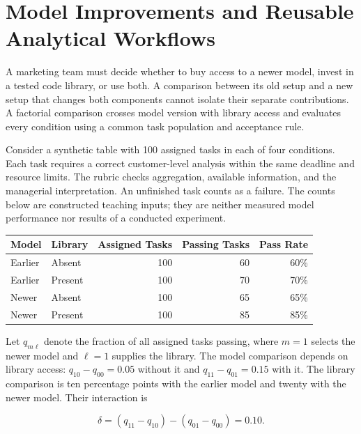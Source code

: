 \hypertarget{M06-model-improvements-and-reusable-analytical-workflows}{%
\section{Model Improvements and Reusable Analytical
Workflows}\label{M06-model-improvements-and-reusable-analytical-workflows}}

\noindent \noindent A marketing team must decide whether to buy access to a newer
model, invest in a tested code library, or use both. A comparison
between its old setup and a new setup that changes both components
cannot isolate their separate contributions. A factorial comparison
crosses model version with library access and evaluates every condition
using a common task population and acceptance rule.

Consider a synthetic table with 100 assigned tasks in each of four
conditions. Each task requires a correct customer-level analysis within
the same deadline and resource limits. The rubric checks aggregation,
available information, and the managerial interpretation. An unfinished
task counts as a failure. The counts below are constructed teaching
inputs; they are neither measured model performance nor results of a
conducted experiment.

\begin{table}[H]
\centering\small
\begin{tabular}{@{}llrrr@{}}
\toprule
Model & Library & Assigned Tasks & Passing Tasks & Pass Rate \\
\midrule

Earlier & Absent & 100 & 60 & 60\% \\
Earlier & Present & 100 & 70 & 70\% \\
Newer & Absent & 100 & 65 & 65\% \\
Newer & Present & 100 & 85 & 85\% \\
\bottomrule
\end{tabular}
\end{table}

Let \(q_{m\ell}\) denote the fraction of all assigned tasks passing,
where \(m=1\) selects the newer model and \(\ell=1\) supplies the
library. The model comparison depends on library access:
\(q_{10}-q_{00}=0.05\) without it and \(q_{11}-q_{01}=0.15\) with it.
The library comparison is ten percentage points with the earlier model
and twenty with the newer model. Their interaction is

\[
\delta=(q_{11}-q_{10})-(q_{01}-q_{00})=0.10.
\]

